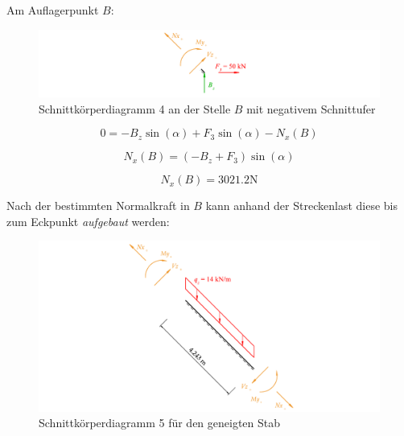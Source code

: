 \documentclass[
  12pt,
  letterpaper,
  DIV=11,
  egregdoesnotlikesansseriftitles]{scrartcl}
\begin{document}
Am Auflagerpunkt \(B\):

\begin{figure}[H]

{\centering \includegraphics{BSI_HS23_Testat_02_files/mediabag/../images/Testat_02_HS23_SKD_4.pdf}

}

\caption{\label{fig-skd_4}Schnittkörperdiagramm 4 an der Stelle \(B\)
mit negativem Schnittufer}

\end{figure}

\begin{equation}0 = - B_{z} \sin{\left(\alpha \right)} + F_{3} \sin{\left(\alpha \right)} - N_{x}{\left(B \right)}\end{equation}

\begin{equation}N_{x}{\left(B \right)} = \left(- B_{z} + F_{3}\right) \sin{\left(\alpha \right)}\end{equation}

\begin{equation}N_{x}{\left(B \right)} = 3021.2 \text{N}\end{equation}

Nach der bestimmten Normalkraft in \(B\) kann anhand der Streckenlast
diese bis zum Eckpunkt \emph{aufgebaut} werden:

\begin{figure}[H]

{\centering \includegraphics{BSI_HS23_Testat_02_files/mediabag/../images/Testat_02_HS23_SKD_5.pdf}

}

\caption{\label{fig-skd5}Schnittkörperdiagramm 5 für den geneigten Stab}

\end{figure}
\end{document}
